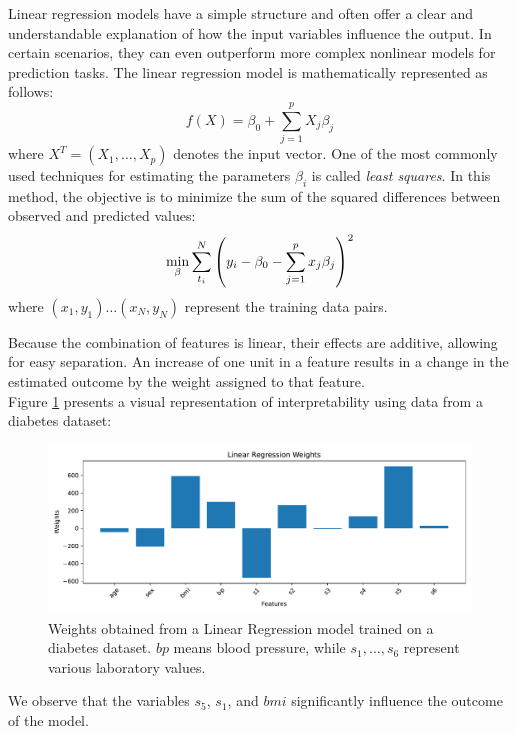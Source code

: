 Linear regression models have a simple structure and often offer a clear and understandable explanation of how the input variables influence the output. In certain scenarios, they can even outperform more complex nonlinear models for prediction tasks.
The linear regression model is mathematically represented as follows:
\begin{equation}
    f(X) = \beta_0 + \sum_{j=1}^p X_j\beta_j
\end{equation}
 where $X^T=(X_1,\dots,X_p)$ denotes the input vector.
One of the most commonly used techniques for estimating the parameters $\beta_i$ is called \textit{least squares}. In this method, the objective is to minimize the sum of the squared differences between observed and predicted values:
\begin{equation}
    \min_{\beta} \sum_{t_i}^N \left(y_i-\beta_0-\sum_{j=1}^p x_j\beta_j\right)^2
    \label{eq:ls_lr}
\end{equation}
where $(x_1,y_1)\dots(x_N,y_N)$ represent the training data pairs.\cite{hastie2009elements}

Because the combination of features is linear, their effects are additive, allowing for easy separation. An increase of one unit in a feature results in a change in the estimated outcome by the weight assigned to that feature. \\
Figure \ref{fig:LRW} presents a visual representation of interpretability using data from a diabetes dataset\cite{diabetes_dataset}:

\begin{figure}[H]
    \centering
    \includegraphics[width=1\linewidth]{pics/Linear_Regression_Weights.pdf}
    \caption{Weights obtained from a Linear Regression model trained on a diabetes dataset. $bp$ means blood pressure, while $s_1, \dots, s_6$ represent various laboratory values.}
    \label{fig:LRW}
\end{figure}

We observe that the variables $s_5$, $s_1$, and $bmi$ significantly influence the outcome of the model.

